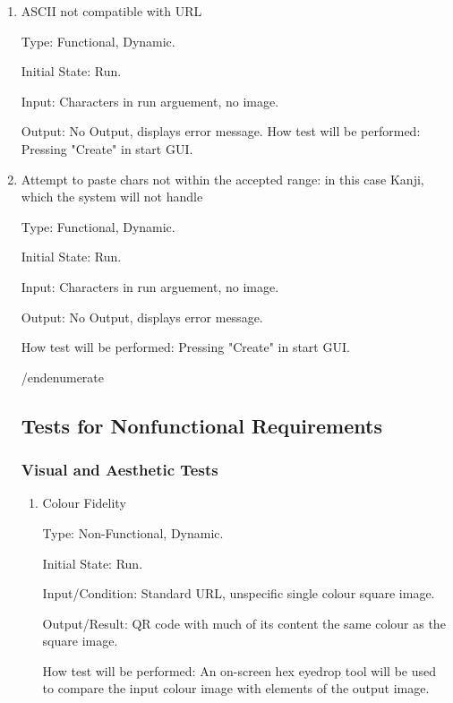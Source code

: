 \documentclass[12pt, titlepage]{article}
\begin{document}
\begin{enumerate}

\item{ASCII not compatible with URL\\}

Type: Functional, Dynamic.
					
Initial State: Run.
					
Input: Characters in run arguement, no image.
					
Output: No Output, displays error message.
How test will be performed: Pressing "Create" in start GUI.

\item{Attempt to paste chars not within the accepted range: in this case Kanji, which the system will not handle\\}

Type: Functional, Dynamic.
					
Initial State: Run.
					
Input: Characters in run arguement, no image.
					
Output: No Output, displays error message.
					
How test will be performed: Pressing "Create" in start GUI.

/end{enumerate} %

\subsection{Tests for Nonfunctional Requirements}

\subsubsection{Visual and Aesthetic Tests}

\begin{enumerate}

\item{Colour Fidelity\\}

Type: Non-Functional, Dynamic.
					
Initial State: Run.
					
Input/Condition: Standard URL, unspecific single colour square image.
					
Output/Result: QR code with much of its content the same colour as the square image.
					
How test will be performed: An on-screen hex eyedrop tool will be used to compare the input colour image with elements of the output image.
					

\end{enumerate}
\end{enumerate}
\end{document}
